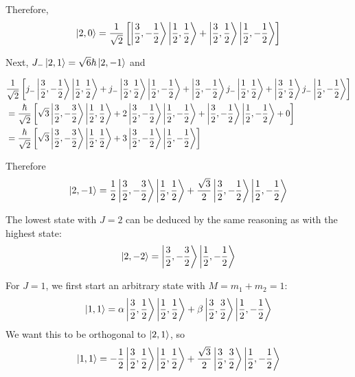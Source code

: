 \documentclass[a4paper,twoside]{article}
\begin{document}
\begin{problem}
    Therefore,
    \begin{equation}
        \ket{2,0} = \frac{1}{\sqrt{2}} \left[\ket{\frac{3}{2}, - \frac{1}{2}}\ket{\frac{1}{2}, \frac{1}{2}} +\ket{\frac{3}{2}, \frac{1}{2}}\ket{\frac{1}{2}, - \frac{1}{2}} \right]
    \end{equation}

    Next, $ J_-\ket{2,1} = \sqrt{6} \hbar\ket{2,-1} $ and

    \begin{align}
        & \frac{1}{\sqrt{2}} \left[j_-\ket{\frac{3}{2}, - \frac{1}{2}}\ket{\frac{1}{2}, \frac{1}{2}} + j_-\ket{\frac{3}{2}, \frac{1}{2}}\ket{\frac{1}{2}, - \frac{1}{2}} + \ket{\frac{3}{2}, - \frac{1}{2}}j_-\ket{\frac{1}{2}, \frac{1}{2}} +\ket{\frac{3}{2}, \frac{1}{2}}j_-\ket{\frac{1}{2}, - \frac{1}{2}}  \right] \\
        &= \frac{\hbar}{\sqrt{2}} \left[ \sqrt{3} \ket{\frac{3}{2}, - \frac{3}{2}}\ket{\frac{1}{2}, \frac{1}{2}} + 2 \ket{\frac{3}{2}, -\frac{1}{2}}\ket{\frac{1}{2}, - \frac{1}{2}} + \ket{\frac{3}{2}, - \frac{1}{2}}\ket{\frac{1}{2}, -\frac{1}{2}} + 0\right] \\
        &= \frac{\hbar}{\sqrt{2}} \left[ \sqrt{3}\ket{\frac{3}{2}, - \frac{3}{2}}\ket{\frac{1}{2}, \frac{1}{2}} + 3 \ket{\frac{3}{2}, - \frac{1}{2}}\ket{\frac{1}{2},-\frac{1}{2}} \right]
    \end{align}

    Therefore
    \begin{equation}
        \ket{2,-1} = \frac{1}{2} \ket{\frac{3}{2}, - \frac{3}{2}}\ket{\frac{1}{2}, \frac{1}{2}} + \frac{\sqrt{3}}{2} \ket{\frac{3}{2}, - \frac{1}{2}}\ket{\frac{1}{2}, -\frac{1}{2}}
    \end{equation}

    The lowest state with $ J = 2 $ can be deduced by the same reasoning as with the highest state:
    \begin{equation}
        \ket{2,-2} =\ket{\frac{3}{2}, - \frac{3}{2}}\ket{\frac{1}{2},-\frac{1}{2}}
    \end{equation}

    For $ J = 1 $, we first start an arbitrary state with $ M = m_1 + m_2 = 1 $:
    \begin{equation}
        \ket{1,1} = \alpha\ket{\frac{3}{2}, \frac{1}{2}}\ket{\frac{1}{2}, \frac{1}{2}} + \beta\ket{\frac{3}{2}, \frac{3}{2}}\ket{\frac{1}{2}, - \frac{1}{2}}
    \end{equation}
    We want this to be orthogonal to $\ket{2,1} $, so
    \begin{equation}
        \ket{1, 1} = - \frac{1}{2} \ket{\frac{3}{2}, \frac{1}{2}}\ket{\frac{1}{2}, \frac{1}{2}} + \frac{\sqrt{3}}{2} \ket{\frac{3}{2}, \frac{3}{2}}\ket{\frac{1}{2}, - \frac{1}{2}}
    \end{equation}


\end{problem}
\end{document}
